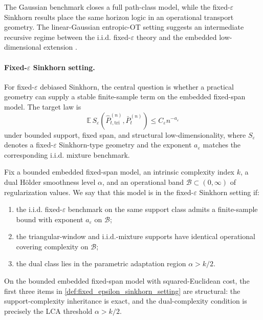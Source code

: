 The Gaussian benchmark closes a full path-class model, while the
fixed-$\varepsilon$ Sinkhorn results place the same horizon logic in an
operational transport geometry. The linear-Gaussian entropic-OT setting suggests
an intermediate recursive regime between the i.i.d. fixed-$\varepsilon$ theory
and the embedded low-dimensional extension \citep{Kalman1960,Jazwinski1970,AkyildizEtAl2024}.

\paragraph{Fixed-$\varepsilon$ Sinkhorn setting.}
For fixed-$\varepsilon$ debiased Sinkhorn, the central question is whether a
practical geometry can supply a stable finite-sample term on the embedded
fixed-span model. The target law is
\[
  \mathbb E\,S_{\varepsilon}\!\left(\widehat P_{t,\mathrm{tri}}^{(n)},\bar P_t^{(n)}\right)
  \le C_{\varepsilon} n^{-a_{\varepsilon}}
\]
under bounded support, fixed span, and structural low-dimensionality, where
$S_{\varepsilon}$ denotes a fixed-$\varepsilon$ Sinkhorn-type geometry and the
exponent $a_{\varepsilon}$ matches the corresponding i.i.d. mixture benchmark.

\begin{definition}
\label{def:fixed_epsilon_sinkhorn_setting}
Fix a bounded embedded fixed-span model, an intrinsic complexity index $k$, a
dual H\"older smoothness level $\alpha$, and an operational band
$\mathcal B\subset(0,\infty)$ of regularization values. We say that this model
is in the fixed-$\varepsilon$ Sinkhorn setting if:
\begin{enumerate}[label=(\roman*)]
  \item the i.i.d. fixed-$\varepsilon$ benchmark on the same support class
  admits a finite-sample bound with exponent $a_{\varepsilon}$ on $\mathcal B$;
  \item the triangular-window and i.i.d.-mixture supports have identical
  operational covering complexity on $\mathcal B$;
  \item the dual class lies in the parametric adaptation region $\alpha>k/2$.
\end{enumerate}
\end{definition}

\begin{proposition}
\label{prop:operational_sinkhorn_ingredients}
On the bounded embedded fixed-span model with squared-Euclidean cost, the first
three items in \cref{def:fixed_epsilon_sinkhorn_setting} are structural: the
support-complexity inheritance is exact, and the dual-complexity condition is
precisely the LCA threshold $\alpha>k/2$.
\end{proposition}

